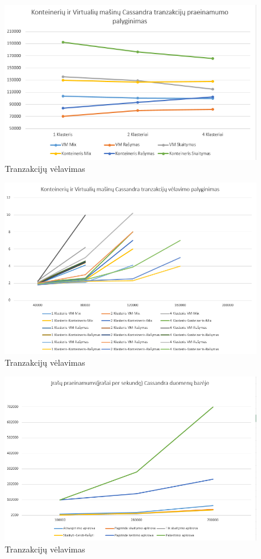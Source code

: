 \documentclass{VUMIFPSkursinis}
\begin{document}
		\begin{figure}[H]
		    \centering
		    \includegraphics[scale=0.5]{img/CasTh}
		    \caption{Tranzakcijų vėlavimas}   %
		    \label{img:mlp}
		\end{figure}
		\begin{figure}[H]
		    \centering
		    \includegraphics[scale=0.5]{img/CasLat}
		    \caption{Tranzakcijų vėlavimas}   %
		    \label{img:mlp}
		\end{figure}
		\begin{figure}[H]
		    \centering
		    \includegraphics[scale=0.5]{img/CasTp}
		    \caption{Tranzakcijų vėlavimas}   %
		    \label{img:mlp}
		\end{figure}
\end{document}
